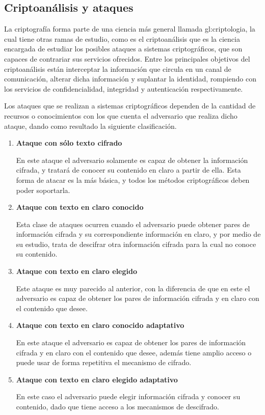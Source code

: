 
\subsection{Criptoanálisis y ataques}

  La criptografía forma parte de una ciencia más general llamada
  \gls{gl:criptologia}, la cual tiene otras ramas de estudio, como es el
  criptoanálisis que es la ciencia encargada de estudiar los posibles ataques a
  sistemas criptográficos, que son capaces de contrariar sus servicios
  ofrecidos. Entre los principales objetivos del criptoanálisis están
  interceptar la información que circula en un canal de comunicación, alterar
  dicha información y suplantar la identidad, rompiendo con los servicios de
  confidencialidad, integridad y autenticación respectivamente.

  Los ataques que se realizan a sistemas criptográficos dependen de la cantidad
  de recursos o conocimientos con los que cuenta el adversario que realiza dicho
  ataque, dando como resultado la siguiente clasificación.

  \begin{enumerate}

    \item \textbf{Ataque con sólo texto cifrado}

      En este ataque el adversario solamente es capaz de obtener la información
      cifrada, y tratará de conocer su contenido en claro a partir de ella.
      Esta forma de atacar es la más básica, y todos los métodos
      criptográficos deben poder soportarla.

    \item \textbf{Ataque con texto en claro conocido}

      Esta clase de ataques ocurren cuando el adversario puede obtener pares
      de información cifrada y su correspondiente información en claro, y
      por medio de su estudio, trata de descifrar otra información cifrada
      para la cual no conoce su contenido.

    \item \textbf{Ataque con texto en claro elegido}

      Este ataque es muy parecido al anterior, con la diferencia de que en
      este el adversario es capaz de obtener los pares de información
      cifrada y en claro con el contenido que desee.

    \item \textbf{Ataque con texto en claro conocido adaptativo}

      En este ataque el adversario es capaz de obtener los pares de
      información cifrada y en claro con el contenido que desee, además
      tiene amplio acceso o puede usar de forma repetitiva el mecanismo de
      cifrado.

    \item \textbf{Ataque con texto en claro elegido adaptativo}

      En este caso el adversario puede elegir información cifrada y conocer
      su contenido, dado que tiene acceso a los mecanismos de descifrado.

  \end{enumerate}
